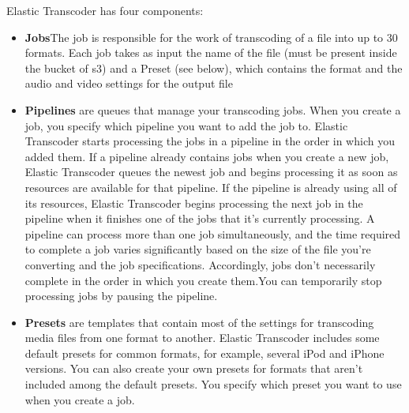 Elastic Transcoder has four components:
\begin{itemize}



\item \textbf{Jobs}The job is responsible for the work of transcoding of a file into up to 30 formats. Each job takes as input the name of the file (must be present inside the bucket of s3) and a Preset (see below), which contains the format and the audio and video settings for the output file


\item \textbf{Pipelines} are queues that manage your transcoding jobs. When you create a job, you specify which pipeline you want to add the job to. Elastic Transcoder starts processing the jobs in a pipeline in the order in which you added them. If a pipeline already contains jobs when you create a new job, Elastic Transcoder queues the newest job and begins processing it as soon as resources are available for that pipeline. If the pipeline is already using all of its resources, Elastic Transcoder begins processing the next job in the pipeline when it finishes one of the jobs that it's currently processing. A pipeline can process more than one job simultaneously, and the time required to complete a job varies significantly based on the size of the file you're converting and the job specifications. Accordingly, jobs don't necessarily complete in the order in which you create them.You can temporarily stop processing jobs by pausing the pipeline.\cite{s3_et}

\item \textbf{Presets} are templates that contain most of the settings for transcoding media files from one format to another. Elastic Transcoder includes some default presets for common formats, for example, several iPod and iPhone versions. You can also create your own presets for formats that aren't included among the default presets. You specify which preset you want to use when you create a job.\cite{s3_et}


\end{itemize}
